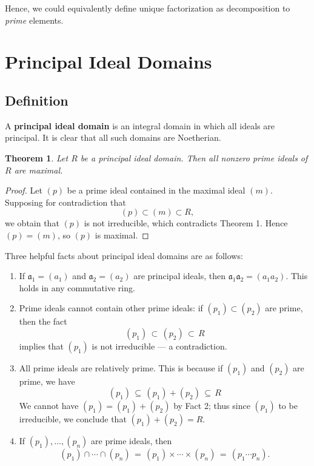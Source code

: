 \documentclass[11pt]{article}
\newtheorem{theorem}{Theorem}
\begin{document}
Hence, we could equivalently define unique factorization as decomposition to \textit{prime} elements.


\section{Principal Ideal Domains}


\subsection{Definition}

A \textbf{principal ideal domain} is an integral domain in which all ideals are principal. It is clear that all such domains are Noetherian.

\begin{adjustwidth}{0.5cm}{}
	\begin{theorem}
		Let $R$ be a principal ideal domain. Then all nonzero prime ideals of $R$ are maximal.
	\end{theorem}
	\begin{proof}
    Let $(p)$ be a prime ideal contained in the maximal ideal $(m)$. Supposing for contradiction that
    \[
      (p) \subset (m) \subset R,
    \]
    we obtain that $(p)$ is not irreducible, which contradicts Theorem 1. Hence $(p) = (m)$, so $(p)$ is maximal.
	\end{proof}
\end{adjustwidth}
Three helpful facts about principal ideal domains are as follows:
\begin{enumerate}
  \item If $\mathfrak{a}_{1} = (a_{1})$ and $\mathfrak{a}_{2} = (a_{2})$ are principal ideals, then $\mathfrak{a}_{1} \mathfrak{a}_{2} = (a_{1}a_{2})$. This holds in any commutative ring.
  \item Prime ideals cannot contain other prime ideals: if $(p_{1}) \subset (p_{2})$ are prime, then the fact
  \[
    (p_{1}) \, \subset \, (p_{2}) \, \subset \, R
  \]
  implies that $(p_{1})$ is not irreducible --- a contradiction.
  \item All prime ideals are relatively prime. This is because if $(p_{1})$ and $(p_{2})$ are prime, we have
  \[
    (p_{1}) \, \subseteq \, (p_{1}) + (p_{2}) \, \subseteq \, R
  \]
  We cannot have $(p_{1}) = (p_{1}) + (p_{2})$ by Fact 2; thus since $(p_{1})$ to be irreducible, we conclude that $(p_{1}) + (p_{2}) = R$.
  \item If $(p_{1}), \ldots, (p_{n})$ are prime ideals, then
  \[
    (p_{1}) \cap \cdots \cap (p_{n}) \, = \, (p_{1}) \times \cdots \times (p_{n}) \, = \, (p_{1} \cdots p_{n}).
  \]
\end{enumerate}
\end{document}
